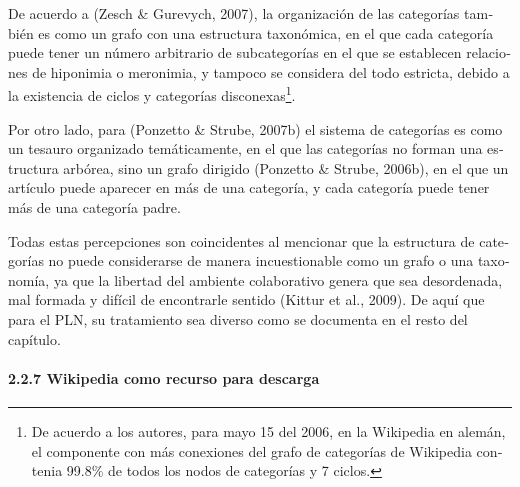\documentclass[letterpaper]{article}
\newcommand\textstylebibuscitbase[1]{#1}
\begin{document}
\bigskip

{\sffamily
\textstylebibuscitbase{\foreignlanguage{spanish}{De acuerdo a
}}\textstylebibuscitbase{\foreignlanguage{spanish}{(Zesch \& Gurevych,
2007)}}\textstylebibuscitbase{\foreignlanguage{spanish}{, la
organizaci\'on de las categor\'ias tambi\'en es como un grafo con una
estructura taxon\'omica, en el que cada categor\'ia puede tener un
n\'umero arbitrario de subcategor\'ias en el que se establecen
relaciones de hiponimia o meronimia, y tampoco se considera del todo
estricta, debido a la existencia de ciclos y categor\'ias
disconexas}}\footnote{\textstylebibuscitbase{\foreignlanguage{english}{\textrm{De
acuerdo a los autores, para mayo 15 del 2006, en la Wikipedia en
alem\'an, el componente con m\'as conexiones del grafo de categor\'ias
de Wikipedia contenia 99.8\% de todos los nodos de categor\'ias y 7
ciclos.}}}}\textstylebibuscitbase{\foreignlanguage{spanish}{.}}}


\bigskip

{\sffamily
\textstylebibuscitbase{\foreignlanguage{spanish}{Por otro lado, para
}}\textstylebibuscitbase{\foreignlanguage{spanish}{(Ponzetto \& Strube,
2007b)}}\textstylebibuscitbase{\foreignlanguage{spanish}{ el sistema de
categor\'ias es como un tesauro organizado tem\'aticamente, en el que
las categor\'ias no forman una estructura arb\'orea, sino un grafo
dirigido }}\textstylebibuscitbase{\foreignlanguage{spanish}{(Ponzetto
\& Strube, 2006b)}}\textstylebibuscitbase{\foreignlanguage{spanish}{,
en el que un art\'iculo puede aparecer en m\'as de una categor\'ia, y
cada categor\'ia puede tener m\'as de una categor\'ia padre.}}}


\bigskip

{\sffamily
\textstylebibuscitbase{\foreignlanguage{spanish}{Todas estas
percepciones son coincidentes al mencionar que la estructura de
categor\'ias no puede considerarse de manera incuestionable como un
grafo o una taxonom\'ia, ya que la libertad del ambiente colaborativo
genera que sea desordenada, mal formada y dif\'icil de encontrarle
sentido }}\textstylebibuscitbase{\foreignlanguage{spanish}{(Kittur et
al., 2009)}}\textstylebibuscitbase{\foreignlanguage{spanish}{. De
aqu\'i que para el PLN, su tratamiento sea diverso como se documenta en
el resto del cap\'itulo.}}}


\bigskip


\bigskip

\paragraph[2.2.7 Wikipedia como recurso para
descarga]{\textstylebibuscitbase{\foreignlanguage{spanish}{2.2.7
Wikipedia como recurso para descarga}}}
\end{document}
